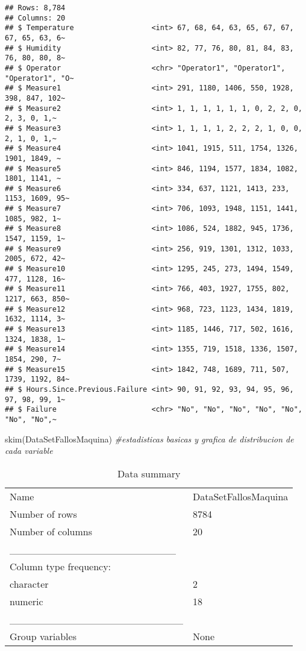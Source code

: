 \documentclass[
]{article}
\newenvironment{Shaded}{\begin{snugshade}}{\end{snugshade}}
\newcommand{\CommentTok}[1]{\textcolor[rgb]{0.56,0.35,0.01}{\textit{#1}}}
\newcommand{\FunctionTok}[1]{\textcolor[rgb]{0.00,0.00,0.00}{#1}}
\newcommand{\NormalTok}[1]{#1}
\begin{document}
\begin{verbatim}
## Rows: 8,784
## Columns: 20
## $ Temperature                  <int> 67, 68, 64, 63, 65, 67, 67, 67, 65, 63, 6~
## $ Humidity                     <int> 82, 77, 76, 80, 81, 84, 83, 76, 80, 80, 8~
## $ Operator                     <chr> "Operator1", "Operator1", "Operator1", "O~
## $ Measure1                     <int> 291, 1180, 1406, 550, 1928, 398, 847, 102~
## $ Measure2                     <int> 1, 1, 1, 1, 1, 1, 0, 2, 2, 0, 2, 3, 0, 1,~
## $ Measure3                     <int> 1, 1, 1, 1, 2, 2, 2, 1, 0, 0, 2, 1, 0, 1,~
## $ Measure4                     <int> 1041, 1915, 511, 1754, 1326, 1901, 1849, ~
## $ Measure5                     <int> 846, 1194, 1577, 1834, 1082, 1801, 1141, ~
## $ Measure6                     <int> 334, 637, 1121, 1413, 233, 1153, 1609, 95~
## $ Measure7                     <int> 706, 1093, 1948, 1151, 1441, 1085, 982, 1~
## $ Measure8                     <int> 1086, 524, 1882, 945, 1736, 1547, 1159, 1~
## $ Measure9                     <int> 256, 919, 1301, 1312, 1033, 2005, 672, 42~
## $ Measure10                    <int> 1295, 245, 273, 1494, 1549, 477, 1128, 16~
## $ Measure11                    <int> 766, 403, 1927, 1755, 802, 1217, 663, 850~
## $ Measure12                    <int> 968, 723, 1123, 1434, 1819, 1632, 1114, 3~
## $ Measure13                    <int> 1185, 1446, 717, 502, 1616, 1324, 1838, 1~
## $ Measure14                    <int> 1355, 719, 1518, 1336, 1507, 1854, 290, 7~
## $ Measure15                    <int> 1842, 748, 1689, 711, 507, 1739, 1192, 84~
## $ Hours.Since.Previous.Failure <int> 90, 91, 92, 93, 94, 95, 96, 97, 98, 99, 1~
## $ Failure                      <chr> "No", "No", "No", "No", "No", "No", "No",~
\end{verbatim}

\begin{Shaded}
\begin{Highlighting}[]
\FunctionTok{skim}\NormalTok{(DataSetFallosMaquina) }\CommentTok{\#estadisticas basicas y grafica de distribucion de cada variable}
\end{Highlighting}
\end{Shaded}

\begin{longtable}[]{@{}ll@{}}
\caption{Data summary}\tabularnewline
\toprule()
\endhead
Name & DataSetFallosMaquina \\
Number of rows & 8784 \\
Number of columns & 20 \\
\_\_\_\_\_\_\_\_\_\_\_\_\_\_\_\_\_\_\_\_\_\_\_ & \\
Column type frequency: & \\
character & 2 \\
numeric & 18 \\
\_\_\_\_\_\_\_\_\_\_\_\_\_\_\_\_\_\_\_\_\_\_\_\_ & \\
Group variables & None \\
\bottomrule()
\end{longtable}
\end{document}
